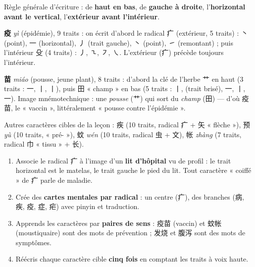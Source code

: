 \documentclass[11pt]{article}
\begin{document}
\begin{propriete}
Règle générale d'écriture : de \textbf{haut en bas}, de \textbf{gauche à droite}, l'\textbf{horizontal avant le vertical}, l'\textbf{extérieur avant l'intérieur}.

\textbf{疫} \emph{yì} (épidémie), 9 traits : on écrit d'abord le radical 疒 (extérieur, 5 traits) : 丶 (point), 一 (horizontal), 丿 (trait gauche), 丶 (point), ㇀ (remontant) ; puis l'intérieur 殳 (4 traits) : 丿, ㇍, ㇇, ㇏. L'extérieur (疒) précède toujours l'intérieur.

\textbf{苗} \emph{miáo} (pousse, jeune plant), 8 traits : d'abord la clé de l'herbe 艹 en haut (3 traits : 一, 丨, 丨), puis 田 « champ » en bas (5 traits : 丨, (trait brisé), 一, 丨, 一). Image mnémotechnique : une \emph{pousse} (艹) qui sort du \emph{champ} (田) — d'où 疫苗, le « vaccin », littéralement « pousse contre l'épidémie ».

Autres caractères cibles de la leçon : 疾 (10 traits, radical 疒 + 矢 « flèche »), 预 \emph{yù} (10 traits, « pré- »), 蚊 \emph{wén} (10 traits, radical 虫 + 文), 帐 \emph{zhàng} (7 traits, radical 巾 « tissu » + 长).
\end{propriete}

\begin{methode}
\begin{enumerate}
\item Associe le radical 疒 à l'image d'un \textbf{lit d'hôpital} vu de profil : le trait horizontal est le matelas, le trait gauche le pied du lit. Tout caractère « coiffé » de 疒 parle de maladie.
\item Crée des \textbf{cartes mentales par radical} : un centre (疒), des branches (病, 疾, 疫, 症, 疟) avec pinyin et traduction.
\item Apprends les caractères par \textbf{paires de sens} : 疫苗 (vaccin) et 蚊帐 (moustiquaire) sont des mots de prévention ; 发烧 et 腹泻 sont des mots de symptômes.
\item Réécris chaque caractère cible \textbf{cinq fois} en comptant les traits à voix haute.
\end{enumerate}
\end{methode}
\end{document}
